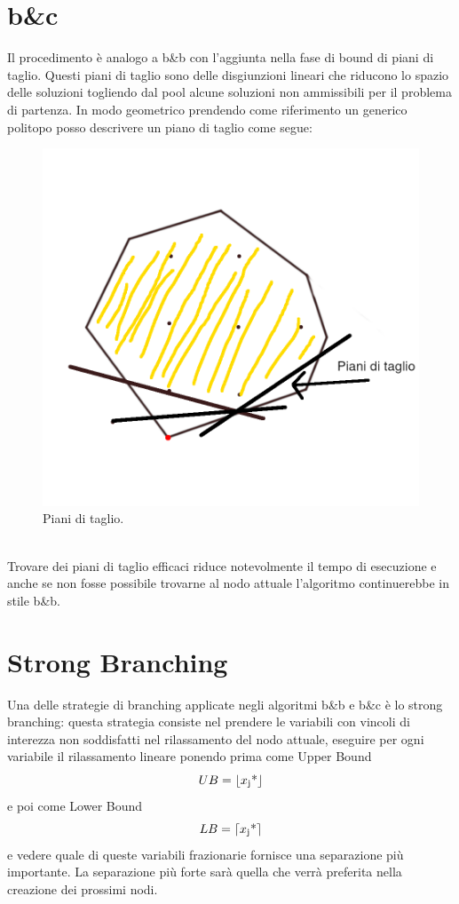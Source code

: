 \documentclass[12pt,a4paper,twoside,openright]{book}
\begin{document}
\section{b\&c}
Il procedimento è analogo a b\&b con l’aggiunta nella fase di bound di piani di taglio. Questi
piani di taglio sono delle disgiunzioni lineari che riducono lo spazio delle soluzioni
togliendo dal pool alcune soluzioni non ammissibili per il problema di partenza. In modo
geometrico prendendo come riferimento un generico politopo posso descrivere un piano di
taglio come segue:\\
\begin{figure}[ht]
    \centering
    \includegraphics [scale = 0.7]{cutting_planes.png}
    \caption{Piani di taglio. }
    \label{fig:cuts}
\end{figure}\\
Trovare dei piani di taglio efficaci riduce notevolmente il tempo di esecuzione e anche se non fosse 
possibile trovarne al nodo attuale l'algoritmo continuerebbe in stile b\&b.
\section{Strong Branching}
Una delle strategie di branching applicate negli algoritmi b\&b e b\&c è lo strong branching:
questa strategia consiste nel prendere le variabili con vincoli di interezza non soddisfatti
nel rilassamento del nodo attuale, eseguire per ogni variabile il rilassamento lineare
ponendo prima come Upper Bound \[UB = \lfloor x \textsubscript{j} \textup{*} \rfloor\] e poi come Lower Bound 
\[LB = \lceil x \textsubscript{j} \textup{*} \rceil\] e vedere quale di queste variabili frazionarie
fornisce una separazione più importante. La separazione più forte sarà quella che verrà 
preferita nella creazione dei prossimi nodi.
\end{document}
